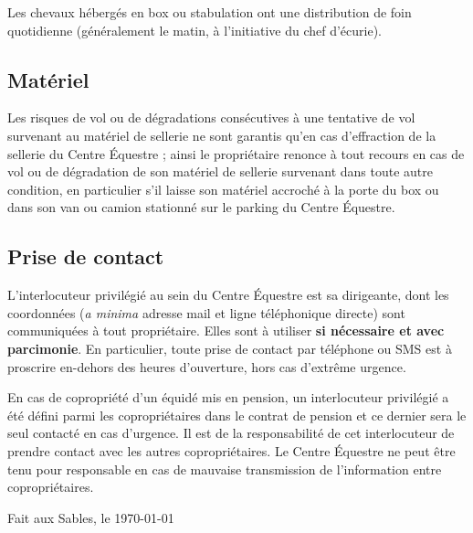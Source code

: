 \documentclass[11pt,a4paper]{article}
\begin{document}
   Les chevaux hébergés en box ou stabulation ont une distribution de foin quotidienne (généralement le matin, à l'initiative du chef d'écurie).

   \subsection*{Matériel}
   Les risques de vol ou de dégradations consécutives à une tentative de vol survenant au matériel de sellerie ne sont garantis qu'en cas d'effraction de la sellerie du Centre Équestre ; ainsi le propriétaire renonce à tout recours en cas de vol ou de dégradation de son matériel de sellerie survenant dans toute autre condition, en particulier s'il laisse son matériel accroché à la porte du box ou dans son van ou camion stationné sur le parking du Centre Équestre.

   \subsection*{Prise de contact}
   L'interlocuteur privilégié au sein du Centre Équestre est sa dirigeante, dont les coordonnées (\textit{a minima} adresse mail et ligne téléphonique directe) sont communiquées à tout propriétaire.
   Elles sont à utiliser \textbf{si nécessaire et avec parcimonie}.
   En particulier, toute prise de contact par téléphone ou SMS est à proscrire en-dehors des heures d'ouverture, hors cas d'extrême urgence.

   En cas de copropriété d'un équidé mis en pension, un interlocuteur privilégié a été défini parmi les copropriétaires dans le contrat de pension et ce dernier sera le seul contacté en cas d'urgence.
   Il est de la responsabilité de cet interlocuteur de prendre contact avec les autres copropriétaires.
   Le Centre Équestre ne peut être tenu pour responsable en cas de mauvaise transmission de l'information entre copropriétaires.

   \vfill
   \begin{flushright}
      Fait aux Sables, le \today \\
   \end{flushright}
\end{document}
